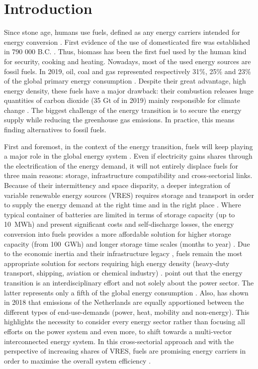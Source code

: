 \section{Introduction}
\label{sec:intro}
Since stone age, humans use fuels, defined as any energy carriers intended for energy conversion \cite{FAO_biofuel, ISO16559}. First evidence of the use of domesticated fire was established in 790 000 B.C. \cite{alperson2010acheulian}. Thus, biomass has been the first fuel used by the human kind for security, cooking and heating. Nowadays, most of the used energy sources are fossil fuels. In 2019, oil, coal and gas represented respectively 31\%, 25\% and 23\% of the global primary energy consumption \cite{ourworld_2019}. Despite their great advantage, high energy density, these fuels have a major drawback: their combustion releases huge quantities of carbon dioxide (35 Gt of  in 2019) mainly responsible for climate change \cite{iea2020world}. The biggest challenge of the energy transition is to secure the energy supply while reducing the greenhouse gas emissions. In practice, this means finding alternatives to fossil fuels.

First and foremost, in the context of the energy transition, fuels will keep playing a major role in the global energy system \cite{Ahlgren2012}. Even if electricity gains shares through the electrification of the energy demand, it will not entirely displace fuels for three main reasons: storage, infrastructure compatibility and cross-sectorial links. Because of their intermittency and space disparity, a deeper integration of variable renewable energy sources (VRES) requires storage and transport in order to supply the energy demand at the right time and in the right place \cite{Brouwer2016,Evans2012,Gallo2016,hall2008,Rosa2017}. Where typical container of batteries are limited in terms of storage capacity (up to 10~MWh) and present significant costs and self-discharge losses, the energy conversion into fuels provides a more affordable solution for higher storage capacity (from 100~GWh) and longer storage time scales (months to year) \cite{Rosa2017}. Due to the economic inertia and their infrastructure legacy \cite{Ahlgren2012}, fuels remain the most appropriate solution for sectors requiring high energy density (\eg heavy-duty transport, shipping, aviation or chemical industry) \cite{Albrecht2020,Decker2019,Goede2018,Pearson2012,Rosa2017,Stancin2020,Trieb2018,Zeman2008}. 
\citet{contino2020whole} point out that the energy transition is an interdisciplinary effort and not solely about the power sector. The latter represents only a fifth of the global energy consumption \cite{iea_renewable}. Also, \citet{Goede2018} has shown in 2018 that  emissions of the Netherlands are equally apportioned between the different types of end-use-demands (\ie power, heat, mobility and non-energy). This highlights the necessity to consider every energy sector rather than focusing all efforts on the power system and even more, to shift towards a multi-vector interconnected energy system. In this cross-sectorial approach and with the perspective of increasing shares of VRES, fuels are promising energy carriers in order to maximise the overall system efficiency \cite{mathiesen2015, Stancin2020}.

